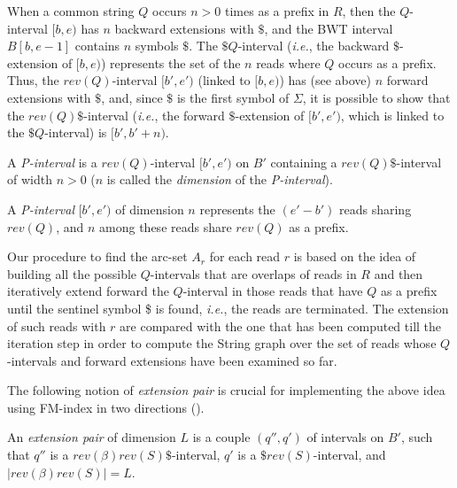 \documentclass[runningheads,envcountsame,a4paper]{llncs}
\newcommand{\ie}{\textit{i.e.},\xspace}
\begin{document}
When a common string $Q$ occurs $n > 0$ times as a prefix in $R$, then the $Q$-interval $[b,e)$ has $n$ backward extensions with $\$$, and the BWT interval $B[b,e-1]$ contains $n$ symbols $\$$. The $\$ Q$-interval (\ie the backward $\$$-extension of $[b,e)$) represents the set of the $n$ reads where $Q$ occurs as a prefix. Thus, the $rev(Q)$-interval $[b',e')$ (linked to $[b,e)$) has (see above) $n$ forward extensions with $\$$, and, since $\$$ is the first symbol of $\Sigma$, it is possible to show that the $rev(Q) \$$-interval (\ie the forward $\$$-extension of $[b',e')$, which is linked to the $\$ Q$-interval) is $[b',b'+n)$.

\begin{definition}
A \emph{P-interval} is a $rev(Q)$-interval $[b',e')$ on $B'$ containing
a $rev(Q)\$$-interval of width $n>0$ ($n$ is called the \emph{dimension}
of the \emph{P-interval}).
\end{definition}

A \emph{P-interval} $[b',e')$ of dimension $n$ represents the $(e'-b')$
reads sharing $rev(Q)$, and $n$ among these reads share $rev(Q)$ as a
prefix.



Our procedure to find the arc-set $A_r$ for each read $r$ is based on
the idea of building all the possible $Q$-intervals that are overlaps of
reads in $R$ and then iteratively extend forward the $Q$-interval in
those reads that have $Q$ as a prefix until the sentinel symbol \$ is
found, \ie the reads are terminated.
The extension of such reads with $r$ are compared with the one that has
been computed till the iteration step in order to compute the String
graph over the set of reads whose $Q$-intervals and forward extensions
have been examined so far.

The following notion of \emph{extension pair} is crucial for
implementing the above idea using FM-index in two directions
(\cite{Lam2009}).


\begin{definition}\label{extension-pair}
An \emph{extension pair} of dimension $L$ is a couple $(q'', q')$ of
intervals on $B'$, such that $q''$ is a $rev(\beta)rev(S)\$$-interval,
$q'$ is a $\$rev(S)$-interval, and $|rev(\beta)rev(S)| = L$.
\end{definition}
\end{document}
